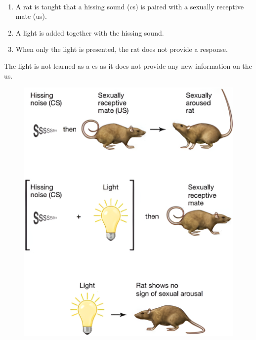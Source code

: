 \begin{example}
    \phantom{} \label{ex:blocking} \\
    \begin{minipage}{0.65\linewidth}
        \begin{enumerate}
            \item A rat is taught that a hissing sound (\ac{cs}) is paired with a sexually receptive mate (\ac{us}).
            \item A light is added together with the hissing sound.
            \item When only the light is presented, the rat does not provide a response.
        \end{enumerate}

        The light is not learned as a \ac{cs} as it does not provide any new information on the \ac{us}.
    \end{minipage}
    \begin{minipage}{0.35\linewidth}
        \begin{figure}[H]
            \centering
            \includegraphics[width=\linewidth]{./img/surprise_rats.png}
        \end{figure}
    \end{minipage}
\end{example}



